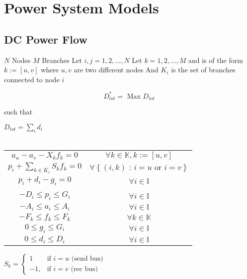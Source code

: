 
\chapter{Power System Models}

\section{DC Power Flow}
$N$ Nodes \newline
$M$ Branches \newline
\newline
Let $i,j = 1,2,...,N$  \newline
Let $k = 1,2,...,M$ and is of the form $k := [u,v]$ \newline
where $u,v$ are two different nodes \newline
And $K_i$ is the set of branches connected to node $i$ \newline

\begin{equation}\label{lp}
D_{tot}^* = \mbox{ Max } D_{tot} 
\end{equation}
\centerline{such that}


\begin{center}
$D_{tot} = \sum_i{d_i} $ \\
\mbox{ } \\
\begin{tabular}{cc}
  
$a_u - a_v - X_k f_k = 0 $ & $\forall k \in \mathbb{K}, k:=\left[ u, v \right]$  \\
$p_i + \sum_{k \in K_i } S_k f_k = 0 $ & $\forall \left\{ \left( i,k \right) \mbox{ : }  i=u \mbox{ or } i=v \right\} $\\
$p_i + d_i - g_i = 0$ & $\forall i \in \mathbb{I}$ \\
\\
$-D_i \leq p_i \leq G_i$ & $\forall i \in \mathbb{I}$ \\
$-A_i \leq a_i \leq  A_i $ & $\forall i \in \mathbb{I}$ \\
$-F_k \leq f_k \leq  F_k $ & $\forall k \in \mathbb{K}$ \\
$ 0 \leq g_i \leq G_i$ & $\forall i \in \mathbb{I}$ \\
$ 0 \leq d_i \leq D_i$ & $\forall i \in \mathbb{I}$ \\

\end{tabular}
\end{center}

\centerline{
 $S_k = 
 \left\{ 
	\begin{array}{lr}
				1 & \mbox{if } i = u \mbox{ (send bus)} \\
			 -1, & \mbox{if } i = v \mbox{ (rec bus)}
	\end{array}
 \right. $ }

